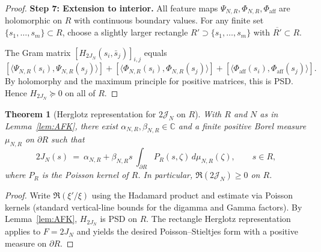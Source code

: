 \documentclass[11pt]{article}
\newtheorem{theorem}{Theorem}
\theoremstyle{definition}
\theoremstyle{remark}
\begin{document}
\begin{proof}
\medskip
\noindent\textbf{Step 7: Extension to interior.}
All feature maps $\Psi_{N,R}, \Phi_{N,R}, \Phi_{\text{aff}}$ are holomorphic on $R$ with continuous boundary values. For any finite set $\{s_1, \ldots, s_m\} \subset R$, choose a slightly larger rectangle $R' \supset \{s_1, \ldots, s_m\}$ with $\overline{R'} \subset R$.

The Gram matrix $[H_{2J_N}(s_i, \bar s_j)]_{i,j}$ equals
\[
  [\langle \Psi_{N,R}(s_i), \Psi_{N,R}(s_j) \rangle] + [\langle \Phi_{N,R}(s_i), \Phi_{N,R}(s_j) \rangle] + [\langle \Phi_{\text{aff}}(s_i), \Phi_{\text{aff}}(s_j) \rangle].
\]
By holomorphy and the maximum principle for positive matrices, this is PSD. Hence $H_{2J_N} \succeq 0$ on all of $R$.
\end{proof}

\begin{theorem}[Herglotz representation for \(2\mathcal J_N\) on \(R\)]\label{thm:herglotz-2JN}
With \(R\) and \(N\) as in Lemma~\ref{lem:AFK}, there exist \(\alpha_{N,R},\beta_{N,R}\in\mathbb C\) and a finite positive Borel measure \(\mu_{N,R}\) on \(\partial R\) such that
\[
 2J_N(s)\ =\ \alpha_{N,R}+\beta_{N,R}s\ \int_{\partial R} P_R(s,\zeta)\,d\mu_{N,R}(\zeta),\qquad s\in R,
\]
where \(P_R\) is the Poisson kernel of \(R\). In particular, \(\Re(2\mathcal J_N)\ge 0\) on \(R\).
\end{theorem}
\begin{proof}
Write \(\Re(\xi'/\xi)\) using the Hadamard product and estimate via Poisson kernels (standard vertical-line bounds for the digamma and Gamma factors).
By Lemma~\ref{lem:AFK}, \(H_{2J_N}\) is PSD on \(R\). The rectangle Herglotz representation applies to \(F=2J_N\) and yields the desired Poisson–Stieltjes form with a positive measure on \(\partial R\).
\end{proof}
\end{document}
